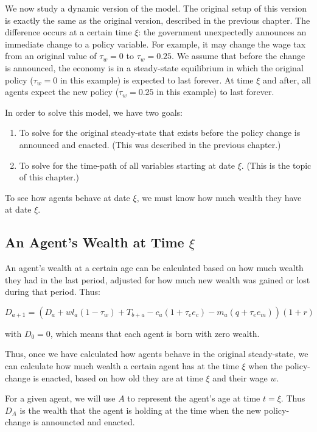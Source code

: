 \documentclass[letter, 12pt, epsf,leqno]{article}
\begin{document}
We now study a dynamic version of the model.  The original setup of this version is exactly the same as the original version, described in the previous chapter.  The difference occurs at a certain time $\xi$: the government unexpectedly announces an immediate change to a policy variable.  For example, it may change the wage tax from an original value of $\tau_w=0$ to $\tau_w=0.25$.  We assume that before the change is announced, the economy is in a steady-state equilibrium in which the original policy ($\tau_w=0$ in this example) is expected to last forever.  At time $\xi$ and after, all agents expect the new policy ($\tau_w=0.25$ in this example) to last forever.\par

In order to solve this model, we have two goals:\par
\begin{enumerate}
\item To solve for the original steady-state that exists before the policy change is announced and enacted.  (This was described in the previous chapter.)
\item To solve for the time-path of all variables starting at date $\xi$.  (This is the topic of this chapter.)
\end{enumerate}

To see how agents behave at date $\xi$, we must know how much wealth they have at date $\xi$. \par

\subsection{An Agent's Wealth at Time $\xi$}

An agent's wealth at a certain age can be calculated based on how much wealth they had in the last period, adjusted for how much new wealth was gained or lost during that period.  Thus:

\begin{equation}D_{a+1} = (D_a + w l_a(1-\tau_w)+T_{b+a} - c_a(1+\tau_e e_c) - m_a(q+\tau_e e_m))  (1 + r)\end{equation}

with $D_0=0$, which means that each agent is born with zero wealth.\par

Thus, once we have calculated how agents behave in the original steady-state, we can calculate how much wealth a certain agent has at the time $\xi$ when the policy-change is enacted, based on how old they are at time $\xi$ and their wage $w$.\par
For a given agent, we will use $A$ to represent the agent's age at time $t=\xi$.  Thus $D_A$ is the wealth that the agent is holding at the time when the new policy-change is announcted and enacted.
\end{document}
